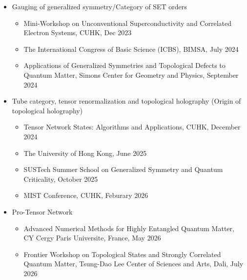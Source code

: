 \documentclass[hidelinks,a4paper]{article}
\begin{document}
\begin{itemize}
\begin{itemize}
     \item  The first International Congress of Basic Science (ICBS), BIMSA, July 2023
     \item  Entangled Quantum Matter Workshop, Tsinghua University, August 2023
  \end{itemize}
  \item Gauging of generalized symmetry/Category of SET orders~\supercite{LYW2312.15958}
  \begin{itemize}\tiny
    \item  Mini-Workshop on Unconventional Superconductivity and Correlated Electron Systems, CUHK, Dec 2023
    \item  The International Congress of Basic Science (ICBS), BIMSA, July 2024
    \item  Applications of Generalized Symmetries and Topological Defects to Quantum Matter, Simons Center for Geometry and Physics, September 2024 
  \end{itemize}
  \item Tube category, tensor renormalization and topological holography (Origin of topological holography)~\supercite{Lan2412.07198}
  \begin{itemize}\tiny
    \item Tensor Network States: Algorithms and Applications, CUHK, December 2024
    \item The University of Hong Kong, June 2025
    \item SUSTech Summer School on Generalized Symmetry and Quantum Criticality, October 2025
    \item MIST Conference, CUHK, Feburary 2026
  \end{itemize}
  \item Pro-Tensor Network~\supercite{YBWL2605.06661}
  \begin{itemize}\tiny
    \item Advanced Numerical Methods for Highly Entangled Quantum Matter, CY Cergy Paris Universite, France, May 2026
    \item Frontier Workshop on Topological States and Strongly Correlated Quantum Matter, Tsung-Dao Lee Center of Sciences and Arts, Dali, July 2026
  \end{itemize}
  
\end{itemize}

\printbibliography[title=Publications]
\end{document}
